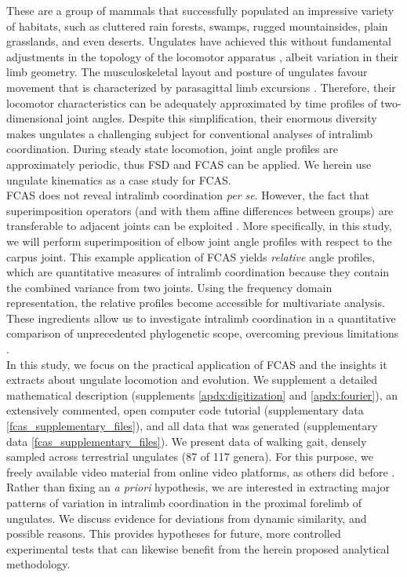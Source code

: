These are a group of mammals that successfully populated an impressive variety of habitats, such as cluttered rain forests, swamps, rugged mountainsides, plain grasslands, and even deserts.
Ungulates have achieved this without fundamental adjustments in the topology of the locomotor apparatus \citep{McMahon1975,Alexander1984}, albeit variation in their limb geometry.
The musculoskeletal layout and posture of ungulates favour movement that is characterized by parasagittal limb excursions \citep[][]{Jenkins1971,Stein1997}.
Therefore, their locomotor characteristics can be adequately approximated by time profiles of two-dimensional joint angles.
Despite this simplification, their enormous diversity makes ungulates a challenging subject for conventional analyses of intralimb coordination.
During steady state locomotion, joint angle profiles are approximately periodic, thus FSD and FCAS can be applied.
We herein use ungulate kinematics as a case study for FCAS.
\\FCAS does not reveal intralimb coordination \textit{per se}.
However, the fact that superimposition operators (and with them affine differences between groups) are transferable to adjacent joints can be exploited \citep[analogous to][]{Mielke2018b}.
More specifically, in this study, we will perform superimposition of elbow joint angle profiles with respect to the carpus joint.
This example application of FCAS yields \textit{relative}  angle profiles, which are quantitative measures of intralimb coordination because they contain the combined variance from two joints.
Using the frequency domain representation, the relative profiles become accessible for multivariate analysis.
These ingredients allow us to investigate intralimb coordination in a quantitative comparison of unprecedented phylogenetic scope, overcoming previous limitations \citep{Gatesy2011}.
\\In this study, we focus on the practical application of FCAS and the insights it extracts about ungulate locomotion and evolution.
We supplement a detailed mathematical description (supplements \ref*{apdx:digitization} and \ref*{apdx:fourier}), an extensively commented, open computer code tutorial (supplementary data \ref{fcas_supplementary_files}), and all data that was generated (supplementary data \ref{fcas_supplementary_files}).
We present data of walking gait, densely sampled across terrestrial ungulates (87 of 117 genera).
For this purpose, we  freely available video material from online video platforms, as others did before \citep{Biancardi2012,Lees2016}.
Rather than fixing an \textit{a priori} hypothesis, we are interested in extracting major patterns of variation in intralimb coordination in the proximal forelimb of ungulates.
We discuss evidence for deviations from dynamic similarity, and possible reasons.
This provides hypotheses for future, more controlled experimental tests that can likewise benefit from the herein proposed analytical methodology.


